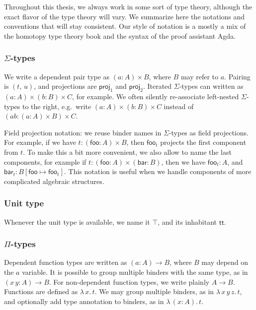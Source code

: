 \documentclass[12pt,a4paper,twoside,openany]{book}
\theoremstyle{remark}
\theoremstyle{definition}
\theoremstyle{theorem}
\newcommand{\mi}[1]{\mathit{#1}}
\newcommand{\ms}[1]{\mathsf{#1}}
\newcommand{\proj}{\mathsf{proj}}
\renewcommand{\tt}{\mathsf{tt}}
\begin{document}
Throughout this thesis, we always work in some sort of type theory, although the
exact flavor of the type theory will vary. We summarize here the notations and
conventions that will stay consistent. Our style of notation is a mostly a mix of
the homotopy type theory book \cite{hottbook} and the syntax of the proof
assistant Agda.

\subsubsection{$\Sigma$-types}

We write a dependent pair type as $(a : A) \times B$, where $B$ may refer to
$a$.  Pairing is $(t,\,u)$, and projections are $\proj_1$ and
$\proj_2$. Iterated $\Sigma$-types can written as $(a : A) \times (b : B) \times
C$, for example. We often silently re-associate left-nested $\Sigma$-types to
the right, e.g.\ write $(a : A) \times (b : B) \times C$ instead of
$(\mi{ab} : (a : A) \times B) \times C$.

Field projection notation: we reuse binder names in $\Sigma$-types as field
projections. For example, if we have $t : (\ms{foo} : A) \times B$, then
$\ms{foo}_t$ projects the first component from $t$. To make this a bit more
convenient, we also allow to name the last components, for example if $t :
(\ms{foo} : A) \times (\ms{bar} : B)$, then we have $\ms{foo}_t : A$, and
$\ms{bar}_t : B[\ms{foo} \mapsto \ms{foo}_t]$. This notation is useful when we
handle components of more complicated algebraic structures.

\subsubsection{Unit type}

Whenever the unit type is available, we name it $\top$, and its inhabitant $\tt$.

\subsubsection{$\Pi$-types}
Dependent function types are written as $(a : A) \to B$, where $B$ may depend on
the $a$ variable. It is possible to group multiple binders with the same type,
as in $(x\,y : A) \to B$. For non-dependent function types, we write plainly $A
\to B$.  Functions are defined as $\lambda\,x.\,t$. We may group multiple
binders, as in $\lambda\,x\,y\,z.\,t$, and optionally add type annotation to binders,
as in $\lambda\,(x : A).\,t$.
\end{document}
